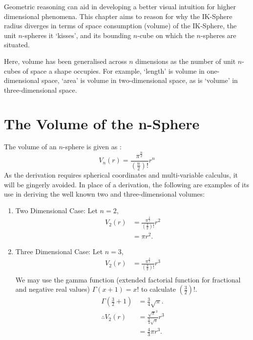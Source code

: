 Geometric reasoning can aid in developing a better visual intuition for higher dimensional phenomena. This chapter aims to reason for why the IK-Sphere radius diverges in terms of space consumption (volume) of the IK-Sphere, the unit $n$-spheres it `kisses', and its bounding $n$-cube on which the $n$-spheres are situated.

\begin{definition}[Volume]
    Here, volume has been generalised across $n$ dimensions as the number of unit $n$-cubes of space a shape occupies. For example, `length' is volume in one-dimensional space, `area' is volume in two-dimensional space, as is `volume' in three-dimensional space. 
\end{definition}

\section{The Volume of the n-Sphere}
The volume of an $n$-sphere is given as \cite{formula_n_sphere}:
\begin{equation}\label{eq:vol of sphere}
    V_n(r)=\frac{\pi^{\frac{n}{2}}}{\left(\frac{n}{2}\right)!}r^n
\end{equation}
As the derivation requires spherical coordinates and multi-variable calculus, it will be gingerly avoided. In place of a derivation, the following are examples of its use in deriving the well known two and three-dimensional volumes:
\begin{enumerate}
    \item Two Dimensional Case:
    Let $n=2$,
    \begin{align*}
        V_2(r)&=\frac{\pi^{\frac{2}{2}}}{\left(\frac{2}{2}\right)!}r^2\\
        &=\pi r^2.
    \end{align*}
    \item Three Dimensional Case:
    Let $n=3$,
    \begin{align*}
        V_2(r)&=\frac{\pi^{\frac{3}{2}}}{\left(\frac{3}{2}\right)!}r^3\\
    \end{align*}
    We may use the gamma function (extended factorial function for fractional and negative real values) $\Gamma(x+1)=x!$ to calculate $\left(\frac{3}{2}\right)!$.
    \begin{align*}
        \Gamma\left(\frac{3}{2}+1\right)&=\frac{3}{4}\sqrt{\pi}.\\
        \therefore V_2(r)&=\frac{\sqrt{\pi}^3}{\frac{3}{4}\sqrt{\pi}}r^3\\
        &=\frac{4}{3}\pi r^3.
    \end{align*}
\end{enumerate}

